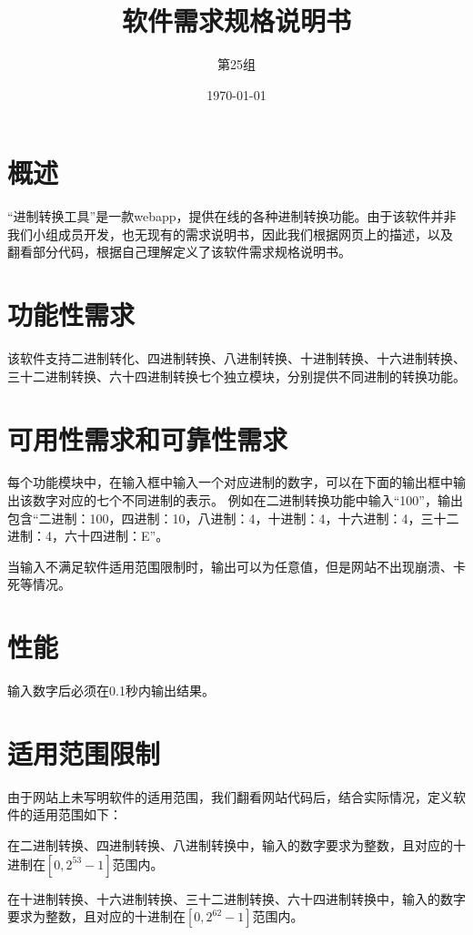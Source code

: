 \documentclass[12pt, a4paper, oneside]{ctexart}
\title{\textbf{软件需求规格说明书}}
\author{第25组}
\date{\today}
\begin{document}
\maketitle
\section{概述}
“进制转换工具”是一款webapp，提供在线的各种进制转换功能。由于该软件并非我们小组成员开发，也无现有的需求说明书，因此我们根据网页上的描述，以及
翻看部分代码，根据自己理解定义了该软件需求规格说明书。

\section{功能性需求}
该软件支持二进制转化、四进制转换、八进制转换、十进制转换、十六进制转换、三十二进制转换、六十四进制转换七个独立模块，分别提供不同进制的转换功能。

\section{可用性需求和可靠性需求}
每个功能模块中，在输入框中输入一个对应进制的数字，可以在下面的输出框中输出该数字对应的七个不同进制的表示。
例如在二进制转换功能中输入“100”，输出包含“二进制：100，四进制：10，八进制：4，十进制：4，十六进制：4，三十二进制：4，六十四进制：E”。

当输入不满足软件适用范围限制时，输出可以为任意值，但是网站不出现崩溃、卡死等情况。

\section{性能}
输入数字后必须在0.1秒内输出结果。

\section{适用范围限制}
由于网站上未写明软件的适用范围，我们翻看网站代码后，结合实际情况，定义软件的适用范围如下：

在二进制转换、四进制转换、八进制转换中，输入的数字要求为整数，且对应的十进制在$[0,2^{53}-1]$范围内。

在十进制转换、十六进制转换、三十二进制转换、六十四进制转换中，输入的数字要求为整数，且对应的十进制在$[0,2^{62}-1]$范围内。
\end{document}
